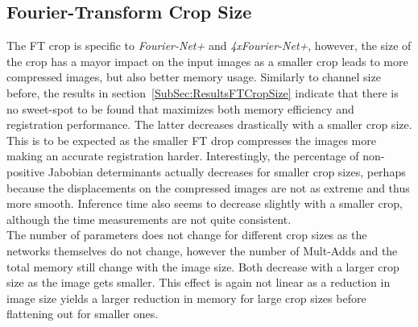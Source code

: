 \subsection{Fourier-Transform Crop Size} \label{SubSec:DiscussionFTCropSize}
The FT crop is specific to \emph{Fourier-Net+} and \emph{4xFourier-Net+}, however, the size of the crop has a mayor impact on the input images as a smaller crop leads to more compressed images, but also better memory usage. Similarly to channel size before, the results in section~\ref{SubSec:ResultsFTCropSize} indicate that there is no sweet-spot to be found that maximizes both memory efficiency and registration performance. The latter decreases drastically with a smaller crop size. This is to be expected as the smaller FT drop compresses the images more  making an accurate registration harder. Interestingly, the percentage of non-positive Jabobian determinants actually decreases for smaller crop sizes, perhaps because the displacements on the compressed images are not as extreme and thus more smooth. Inference time also seems to decrease slightly with a smaller crop, although the time measurements are not quite consistent.\\
The number of parameters does not change for different crop sizes as the networks themselves do not change, however the number of Mult-Adds and the total memory still change with the image size. Both decrease with a larger crop size as the image gets smaller. This effect is again not linear as a reduction in image size yields a larger reduction in memory for large crop sizes before flattening out for smaller ones. 

